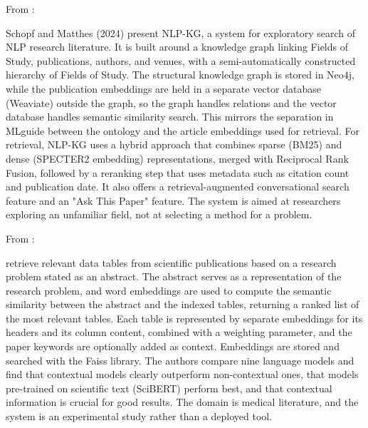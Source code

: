 From \parencite{schopf2024nlp} :


Schopf and Matthes (2024) present NLP-KG, a system for 
exploratory search of NLP research literature. It is built 
around a knowledge graph linking Fields of Study, publications, 
authors, and venues, with a semi-automatically constructed 
hierarchy of Fields of Study. The structural knowledge graph is 
stored in Neo4j, while the publication embeddings are held in a 
separate vector database (Weaviate) outside the graph, so the 
graph handles relations and the vector database handles semantic 
similarity search. This mirrors the separation in MLguide 
between the ontology and the article embeddings used for 
retrieval. For retrieval, NLP-KG uses a hybrid approach that 
combines sparse (BM25) and dense (SPECTER2 embedding) 
representations, merged with Reciprocal Rank Fusion, followed by 
a reranking step that uses metadata such as citation count and 
publication date. It also offers a retrieval-augmented 
conversational search feature and an "Ask This Paper" feature. 
The system is aimed at researchers exploring an unfamiliar 
field, not at selecting a method for a problem.


From \parencite{berenguer2024retrieve_data_from_research} :

\textcite{berenguer2024retrieve_data_from_research} retrieve relevant data tables from 
scientific publications based on a research problem stated as 
an abstract. The abstract serves as a representation of the 
research problem, and word embeddings are used to compute the 
semantic similarity between the abstract and the indexed tables, 
returning a ranked list of the most relevant tables. Each table 
is represented by separate embeddings for its headers and its 
column content, combined with a weighting parameter, and the 
paper keywords are optionally added as context. Embeddings are 
stored and searched with the Faiss library. The authors compare 
nine language models and find that contextual models clearly 
outperform non-contextual ones, that models pre-trained on 
scientific text (SciBERT) perform best, and that contextual 
information is crucial for good results. The domain is medical 
literature, and the system is an experimental study rather than 
a deployed tool.

